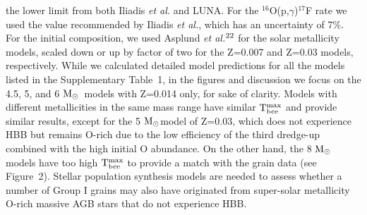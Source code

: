 \documentclass{nature}
\newcommand{\iso}[2]{\hbox{${}^{#1}${#2}}}
\newcommand{\msun}{\ensuremath{{\rm M}_{\odot}}}
\begin{document}
\begin{methods}
the lower limit from both Iliadis {\it et al.}\cite{iliadis10} and LUNA\cite{bruno16}. 
For the \iso{16}O(p,$\gamma$)\iso{17}F rate we used 
the value recommended by Iliadis {\it et al.}\cite{iliadis10}, which has an uncertainty
of 7\%\cite{iliadis08}. 
For the initial composition, we used Asplund 
{\it et al.}$^{\mbox{\scriptsize 22\if@tempswa , 1\fi}}$
for the solar metallicity models,
scaled down or up by factor of two for the Z=0.007 and Z=0.03 models, respectively. 
While we calculated detailed model 
predictions for all the models listed in the Supplementary Table~1, in the 
figures and discussion we focus on the 4.5, 5, and 6 \msun\, models with Z=0.014 only, for sake of 
clarity. 
Models with different metallicities
in the same mass range have similar ${\rm T}^{\rm max}_{\rm bce}$ and 
provide similar results, except for the 5 \msun model of Z=0.03, which does not experience HBB 
but remains O-rich due to the low efficiency of the third dredge-up combined with the high initial 
O abundance.
On the other hand, the 8 \msun\, models have 
too high ${\rm T}^{\rm max}_{\rm bce}$ to provide a match with the grain data 
(see Figure~2).
Stellar population synthesis models are needed to assess whether 
a number of Group I grains may also 
have originated from super-solar metallicity O-rich massive AGB stars that do not experience HBB.

\end{methods}
\end{document}
